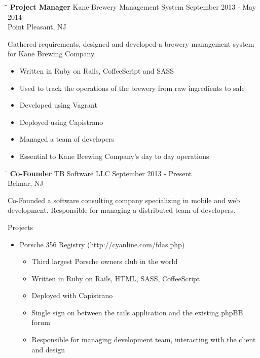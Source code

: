 \documentclass{res}
\begin{document}
\begin{resume}
   \begin{tabbing}
   \hspace{2.3in}\= \hspace{2.6in}\= \kill %
    {\bf Project Manager} \>Kane Brewery Management System     \>September 2013 - May 2014\\
                             \>Point Pleasant, NJ
   \end{tabbing}\vspace{-20pt}      %
   Gathered requirements, designed and developed a brewery management system for Kane Brewing Company.

    \begin{itemize}
        \item Written in Ruby on Rails, CoffeeScript and SASS
        \item Used to track the operations of the brewery from raw ingredients to sale 
        \item Developed using Vagrant
        \item Deployed using Capistrano
        \item Managed a team of developers
        \item Essential to Kane Brewing Company's day to day operations
    \end{itemize}


   \begin{tabbing}
   \hspace{2.3in}\= \hspace{2.6in}\= \kill %
    {\bf Co-Founder} \>TB Software LLC     \>September 2013 - Present\\
                             \>Belmar, NJ
   \end{tabbing}\vspace{-20pt}      %
    Co-Founded a software consulting company specializing in mobile and web development. 
    Responsible for managing a distributed team of developers.

    Projects
    \begin{itemize}
        \item Porsche 356 Registry (http://cyanline.com/fdas.php)
        \begin{itemize}
            \item Third largest Porsche owners club in the world
            \item Written in Ruby on Rails, HTML, SASS, CoffeeScript
            \item Deployed with Capistrano
            \item Single sign on between the rails application and the existing phpBB forum
            \item Responsible for managing development team, interacting with the client and design
        \end{itemize}
    \end{itemize}


\end{resume}
\end{document}
